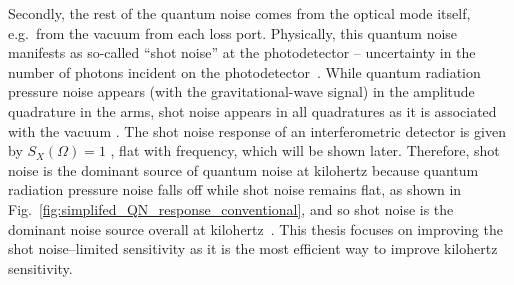 Secondly, the rest of the quantum noise comes from the optical mode itself, e.g.\ from the vacuum from each loss port. Physically, this quantum noise manifests as so-called ``shot noise'' at the photodetector -- uncertainty in the number of photons incident on the photodetector~\cite{}. While quantum radiation pressure noise appears (with the gravitational-wave signal) in the amplitude quadrature in the arms, shot noise appears in all quadratures as it is associated with the vacuum . The shot noise response of an interferometric detector is given by $S_X(\Omega) = 1$ , flat with frequency, which will be shown later. Therefore, shot noise is the dominant source of quantum noise at kilohertz because quantum radiation pressure noise falls off while shot noise remains flat, as shown in Fig.~\ref{fig:simplifed_QN_response_conventional}, and so shot noise is the dominant noise source overall at kilohertz~\cite{}. This thesis focuses on improving the shot noise--limited sensitivity as it is the most efficient way to improve kilohertz sensitivity. 



